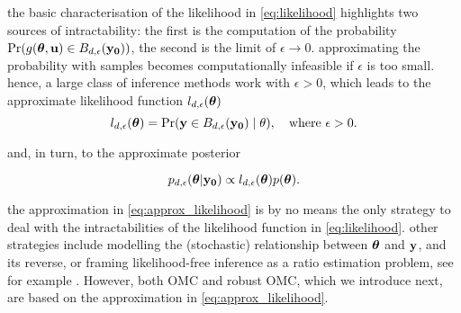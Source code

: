 the basic characterisation of the likelihood in \eqref{eq:likelihood}
highlights two sources of intractability: the first is the computation
of the probability
\(\Pr(g(\boldsymbol{\theta},\mathbf{u}) \in B_{d,\epsilon}(\mathbf{y_0}))\), the second is the
limit of \(\epsilon \to 0\).  approximating the probability with
samples becomes computationally infeasible if \(\epsilon\) is too
small. hence, a large class of inference methods work with
\(\epsilon > 0\), which leads to the approximate likelihood function
\(l_{d, \epsilon}(\boldsymbol{\theta})\)
\begin{equation} \label{eq:approx_likelihood}
  l_{d, \epsilon}(\boldsymbol{\theta}) = \Pr(\mathbf{y} \in B_{d,\epsilon}(\mathbf{y_0}) \mid \theta), \quad \text{where  } \epsilon > 0.
\end{equation}

and, in turn, to the approximate posterior

\begin{equation} \label{eq:approx_posterior}
  p_{d,\epsilon}(\boldsymbol{\theta}|\mathbf{y_0}) \propto l_{d, \epsilon}(\boldsymbol{\theta}) p(\boldsymbol{\theta}).
\end{equation}

the approximation in \eqref{eq:approx_likelihood} is by no means the
only strategy to deal with the intractabilities of the likelihood
function in \eqref{eq:likelihood}. other strategies include modelling
the (stochastic) relationship between \(\boldsymbol{\theta}\) and \(\mathbf{y}\), and its
reverse, or framing likelihood-free inference as a ratio estimation
problem, see for example \citet{blum2010, Wood2006, Papamakarios2016,
  Papamakarios2019, Chen2019, Thomas2020, Hermans2020}. However, both
OMC and robust OMC, which we introduce next, are based on the
approximation in \eqref{eq:approx_likelihood}.

